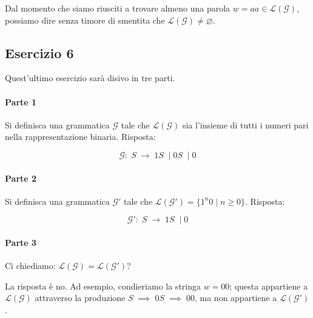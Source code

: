 \documentclass[class=book, crop=false, oneside, 12pt]{standalone}
\begin{document}
\noindent Dal momento che siamo riusciti a trovare almeno una parola \(w = aa \in \mathcal{L(G)}\), possiamo dire senza timore di smentita che \(\mathcal{L(G)} \neq \varnothing\).

\subsection*{Esercizio 6}
Quest'ultimo esercizio sarà disivo in tre parti.

\paragraph{Parte 1}
Si definisca una grammatica \(\mathcal{G}\) tale che \(\mathcal{L(G)}\) sia l'insieme di tutti i numeri pari nella rappresentazione binaria. Risposta:

\begin{equation*}
  \mathcal{G}:\; S \; \to\; 1S\; \mid 0S\; \mid 0
\end{equation*}

\paragraph{Parte 2}
Si definisca una grammatica \(\mathcal{G'}\) tale che \(\mathcal{L(G')} = \{ 1^n0 \mid n \geq 0 \}\). Risposta:

\begin{equation*}
  \mathcal{G'}:\; S\; \to\; 1S\; \mid 0
\end{equation*}

\paragraph{Parte 3}
Ci chiediamo: \(\mathcal{L(G)} = \mathcal{L(G')}\)?

La risposta è no. Ad esempio, condieriamo la stringa \(w = 00\); questa appartiene a \(\mathcal{L(G)}\) attraverso la produzione \(S\; \implies\; 0S\; \implies\; 00 \), ma non appartiene a \(\mathcal{L(G')}\).
\end{document}
